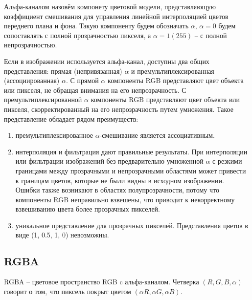 Альфа-каналом назовём компонету цветовой модели, представляющую коэффициент смешивания для управления линейной интерполяцией цветов переднего плана и фона. Такую компоненту будем обозначать $\alpha$, $\alpha = 0$ будем сопоставлять с полной прозрачностью пикселя, а $\alpha=1 (255)$ -- с полной непрозрачностью. \cite{bib1} 

Если в изображении используется альфа-канал, доступны два общих представления: прямая (непривязанная) $\alpha$ и премультиплексированная (ассоциированная) $\alpha$. С прямой $\alpha$ компоненты RGB представляют цвет объекта или пикселя, не обращая внимания на его непрозрачность. С премультиплексированной $\alpha$ компоненты RGB представляют цвет объекта или пикселя, скорректированный на его непрозрачность путем умножения. Такое представление обладает рядом преимуществ: 
\begin{enumerate}
	\item премультиплексированное $\alpha$-смешивание является ассоциативным.
	\item интерполяция и фильтрация дают правильные результаты. При интерполяции или фильтрации изображений без предварительно умноженной $\alpha$ с резкими границами между прозрачными и непрозрачными областями  может привести к границам цветов, которые не были видны в исходном изображении. Ошибки также возникают в областях полупрозрачности, потому что компоненты RGB неправильно взвешены, что приводит к некорректному взвешиванию цвета более прозрачных пикселей.
	\item уникальное представление для прозрачных пикселей. Представления цветов в виде (1, 0.5, 1, 0) невозможны.
\end{enumerate}


\subsection{RGBA}
RGBA -- цветовое пространство RGB c альфа-каналом. Четверка $(R, G, B, \alpha)$ говорит о том, что пиксель покрыт цветом $(\alpha R, \alpha G, \alpha B)$. 

\begin{figure}[ht!]
\end{figure}

